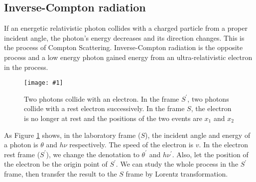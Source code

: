 \documentclass[a4paper, 12pt]{report}
\newcommand{\singleFig}[3]{
  \begin{figure}[!htp]
    \centering
    \texttt{[image: \#1]}
    \caption{#3}
    \label{fig: #1}
  \end{figure}
}
\begin{document}
    \subsection{Inverse-Compton radiation}
      If an energetic relativistic photon collides with a charged particle from a 
      proper incident angle, the photon's energy decreases and its direction changes. 
      This is the process of Compton Scattering. Inverse-Compton radiation is the 
      opposite process and a low energy photon gained energy from an ultra-relativistic 
      electron in the process. 
      
      \singleFig{inverse_compton}{0.45}{Two photons collide with an 
      electron. In the frame $S^{\prime}$, two photons collide with a rest electron 
      successively. In the frame $S$, the electron is no longer at rest and the 
      positions of the two events are $x_1$ and $x_2$}
      As Figure \ref{fig: inverse_compton} shows, in the laboratory frame ($S$), the 
      incident angle and energy of a photon is $\theta$ and $h \nu$ respectively. 
      The speed of the electron is $v$. In the electron rest frame ($S^{\prime}$), 
      we change the denotation to $\theta^{\prime}$ and $h \nu^{\prime}$. Also, let 
      the position of the electron be the origin point of $S^{\prime}$. We can study 
      the whole process in the $S^{\prime}$ frame, then transfer the result to the $S$ 
      frame by Lorentz transformation. 
\end{document}
